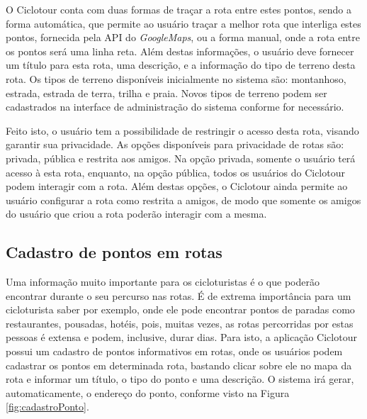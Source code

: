 O Ciclotour conta com duas formas de traçar a rota entre estes pontos, sendo a forma automática, que permite ao usuário traçar a melhor rota que 
interliga estes pontos, fornecida pela API do \textit{GoogleMaps}, ou a forma manual, onde a rota entre os pontos será uma linha reta. Além destas 
informações, o usuário deve fornecer um título para esta rota, uma descrição, e a informação do tipo de terreno desta rota. Os tipos de 
terreno disponíveis inicialmente no sistema 
são: montanhoso, estrada, estrada de terra, trilha e praia. Novos tipos de terreno podem ser cadastrados na interface de administração do sistema 
conforme for necessário.

Feito isto, o usuário tem a possibilidade de restringir o acesso desta rota, visando garantir sua privacidade. As opções disponíveis para privacidade 
de rotas são: privada, pública e restrita aos amigos. Na opção privada, somente o usuário terá acesso à esta rota, 
enquanto, na opção pública, todos os 
usuários do Ciclotour podem interagir com a rota. Além destas opções, o Ciclotour ainda permite ao usuário configurar a rota como restrita a amigos, 
de modo que somente os amigos do usuário que criou a rota poderão interagir com a mesma.

\subsection{Cadastro de pontos em rotas}
Uma informação muito importante para os cicloturistas é o que poderão encontrar durante o seu percurso nas rotas. É de extrema importância para um 
cicloturista saber por exemplo, onde ele pode encontrar pontos de paradas como restaurantes, pousadas, hotéis, pois, muitas vezes, 
as rotas percorridas
por estas pessoas é extensa e podem, inclusive, durar dias. Para isto, a aplicação Ciclotour possui um cadastro de pontos informativos em rotas, onde
os usuários podem cadastrar os pontos em determinada rota, bastando clicar sobre ele no mapa da rota e informar um título, o tipo do ponto e uma 
descrição. O sistema irá gerar, automaticamente, o endereço do ponto, conforme visto na Figura \ref{fig:cadastroPonto}. 

